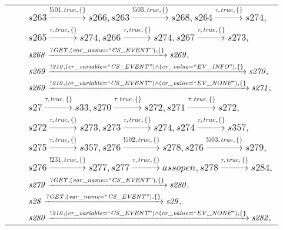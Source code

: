 \begin{tabular}{lcp{350px}}
& & $\mathit{s263}\xrightarrow{\mathit{!501}, \mathit{true}, \{\}}\mathit{s266},\mathit{s263}\xrightarrow{\mathit{!503}, \mathit{true}, \{\}}\mathit{s268},\mathit{s264}\xrightarrow{\mathit{\tau}, \mathit{true}, \{\}}\mathit{s274},$ \\
& & $\mathit{s265}\xrightarrow{\mathit{\tau}, \mathit{true}, \{\}}\mathit{s274},\mathit{s266}\xrightarrow{\mathit{\tau}, \mathit{true}, \{\}}\mathit{s274},\mathit{s267}\xrightarrow{\mathit{\tau}, \mathit{true}, \{\}}\mathit{s273},$ \\
& & $\mathit{s268}\xrightarrow{\mathit{?GET}, \mathit{(var\_name = ``CS\_EVENT")}, \{\}}\mathit{s269},$ \\
& & $\mathit{s269}\xrightarrow{\mathit{!210}, \mathit{(cr\_variable = ``CS\_EVENT") \land (cr\_value = ``EV\_INFO")}, \{\}}\mathit{s270},$ \\
& & $\mathit{s269}\xrightarrow{\mathit{!210}, \mathit{(cr\_variable = ``CS\_EVENT") \land (cr\_value = ``EV\_NONE")}, \{\}}\mathit{s271},$ \\
& & $\mathit{s27}\xrightarrow{\mathit{\tau}, \mathit{true}, \{\}}\mathit{s33},\mathit{s270}\xrightarrow{\mathit{\tau}, \mathit{true}, \{\}}\mathit{s272},\mathit{s271}\xrightarrow{\mathit{\tau}, \mathit{true}, \{\}}\mathit{s272},$ \\
& & $\mathit{s272}\xrightarrow{\mathit{\tau}, \mathit{true}, \{\}}\mathit{s273},\mathit{s273}\xrightarrow{\mathit{\tau}, \mathit{true}, \{\}}\mathit{s274},\mathit{s274}\xrightarrow{\mathit{\tau}, \mathit{true}, \{\}}\mathit{s357},$ \\
& & $\mathit{s275}\xrightarrow{\mathit{\tau}, \mathit{true}, \{\}}\mathit{s357},\mathit{s276}\xrightarrow{\mathit{!502}, \mathit{true}, \{\}}\mathit{s278},\mathit{s276}\xrightarrow{\mathit{!503}, \mathit{true}, \{\}}\mathit{s279},$ \\
& & $\mathit{s276}\xrightarrow{\mathit{!231}, \mathit{true}, \{\}}\mathit{s277},\mathit{s277}\xrightarrow{\mathit{\tau}, \mathit{true}, \{\}}\mathit{assopen},\mathit{s278}\xrightarrow{\mathit{\tau}, \mathit{true}, \{\}}\mathit{s284},$ \\
& & $\mathit{s279}\xrightarrow{\mathit{?GET}, \mathit{(var\_name = ``CS\_EVENT")}, \{\}}\mathit{s280},$ \\
& & $\mathit{s28}\xrightarrow{\mathit{?GET}, \mathit{(var\_name = ``CS\_EVENT")}, \{\}}\mathit{s29},$ \\
& & $\mathit{s280}\xrightarrow{\mathit{!210}, \mathit{(cr\_variable = ``CS\_EVENT") \land (cr\_value = ``EV\_NONE")}, \{\}}\mathit{s282},$ \\

\end{tabular}
